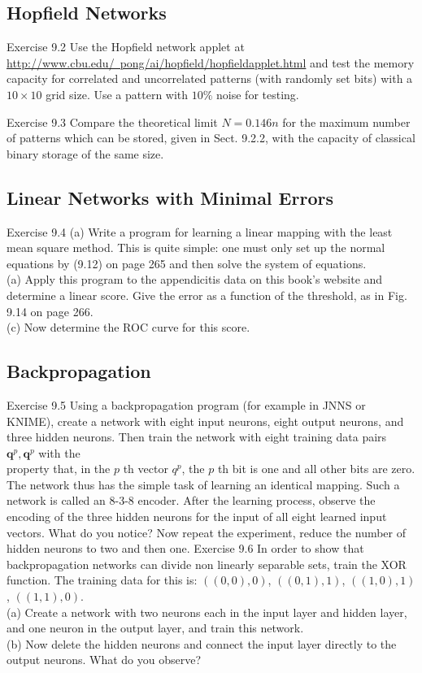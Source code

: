 \documentclass[10pt]{book}
\begin{document}
\subsection{Hopfield Networks}
Exercise 9.2 Use the Hopfield network applet at \href{http://www.cbu.edu/~pong/ai/hopfield/hopfieldapplet.html}{http://www.cbu.edu/~pong/ai/hopfield/hopfieldapplet.html} and test the memory capacity for correlated and uncorrelated patterns (with randomly set bits) with a $10 \times 10$ grid size. Use a pattern with $10\%$ noise for testing.

Exercise 9.3 Compare the theoretical limit $N=0.146 n$ for the maximum number of patterns which can be stored, given in Sect. 9.2.2, with the capacity of classical binary storage of the same size.

\subsection{Linear Networks with Minimal Errors}
Exercise 9.4
(a) Write a program for learning a linear mapping with the least mean square method. This is quite simple: one must only set up the normal equations by (9.12) on page 265 and then solve the system of equations.\\
(a) Apply this program to the appendicitis data on this book's website and determine a linear score. Give the error as a function of the threshold, as in Fig. 9.14 on page 266.\\
(c) Now determine the ROC curve for this score.

\subsection{Backpropagation}
Exercise 9.5 Using a backpropagation program (for example in JNNS or KNIME), create a network with eight input neurons, eight output neurons, and three hidden neurons. Then train the network with eight training data pairs $\boldsymbol{q}^{p}, \boldsymbol{q}^{p}$ with the\\
property that, in the $p$ th vector $q^{p}$, the $p$ th bit is one and all other bits are zero. The network thus has the simple task of learning an identical mapping. Such a network is called an 8-3-8 encoder. After the learning process, observe the encoding of the three hidden neurons for the input of all eight learned input vectors. What do you notice? Now repeat the experiment, reduce the number of hidden neurons to two and then one.
Exercise 9.6 In order to show that backpropagation networks can divide non linearly separable sets, train the XOR function. The training data for this is: $((0,0), 0)$, $((0,1), 1)$, $((1,0), 1)$, $((1,1), 0)$.\\
(a) Create a network with two neurons each in the input layer and hidden layer, and one neuron in the output layer, and train this network.\\
(b) Now delete the hidden neurons and connect the input layer directly to the output neurons. What do you observe?
\end{document}
